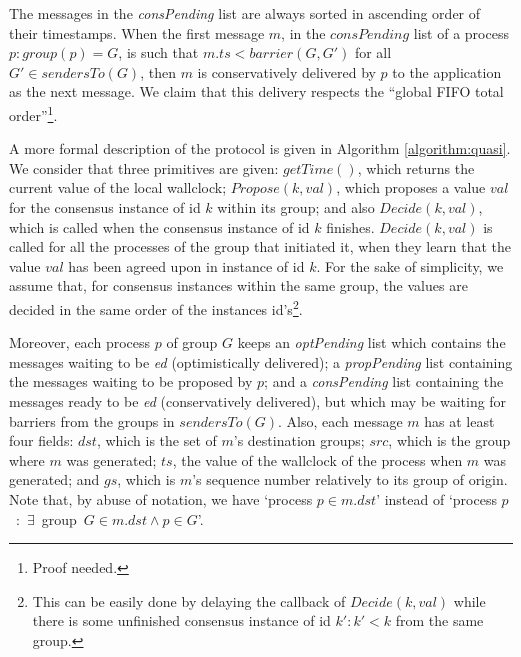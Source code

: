 \documentclass[times, 10pt]{article}
\begin{document}
The messages in the \textit{consPending} list are always sorted in ascending order of their timestamps. When the first message $m$, in the $consPending$ list of a process $p : group(p) = G$, is such that $m.ts < barrier(G, G')$ for all $G' \in sendersTo(G)$, then $m$ is conservatively delivered by $p$ to the application as the next message. We claim that this delivery respects the ``global FIFO total order''\footnote{Proof needed.}.


A more formal description of the protocol is given in Algorithm \ref{algorithm:quasi}. We consider that three primitives are given: $getTime()$, which returns the current value of the local wallclock; $Propose(k, val)$, which proposes a value $val$ for the consensus instance of id $k$ within its group; and also $Decide(k, val)$, which is called when the consensus instance of id $k$ finishes. $Decide(k, val)$ is called for all the processes of the group that initiated it, when they learn that the value $val$ has been agreed upon in instance of id $k$. For the sake of simplicity, we assume that, for consensus instances within the same group, the values are decided in the same order of the instances id's\footnote{This can be easily done by delaying the callback of $Decide(k, val)$ while there is some unfinished consensus instance of id $k': k' < k$ from the same group.}.

Moreover, each process $p$ of group $G$ keeps an \textit{optPending} list which contains the messages waiting to be \mbox{\textit{\opt{}ed}} (optimistically delivered); a \mbox{\textit{propPending}} list containing the messages waiting to be proposed by $p$; and a \mbox{\textit{consPending}} list containing the messages ready to be \textit{\cons{}ed} (conservatively delivered), but which may be waiting for barriers from the groups in $sendersTo(G)$. Also, each message $m$ has at least four fields: $dst$, which is the set of $m$'s destination groups; $src$, which is the group where $m$ was generated; $ts$, the value of the wallclock of the process when $m$ was generated; and $gs$, which is $m$'s sequence number relatively to its group of origin. Note that, by abuse of notation, we have `process \mbox{$p \in m.dst$'} instead of `process \mbox{$p$ : $\exists$ group $G \in m.dst \wedge p \in G$'}.
\end{document}
